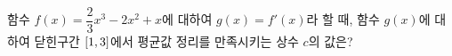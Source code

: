 함수 $f(x)=\dfrac{2}{3}x^3-2x^2+x$에 대하여 $g(x)=f'(x)$라 할 때, 함수 $g(x)$에 대하여 닫힌구간 $[1{,}\mkern3mu\mathopen{}3]$에서 평균값 정리를 만족시키는 상수 $c$의 값은?
